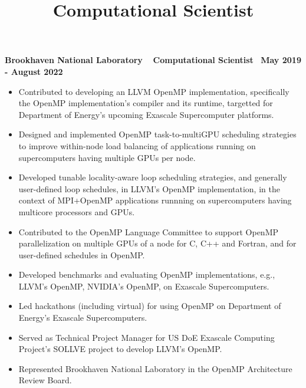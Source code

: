 \title{Computational Scientist} 
\textbf{{Brookhaven National Laboratory $\>$$\>$$\>$$\>$Computational Scientist$\>$$\>$$\>$$\>$May 2019 - August 2022}}
\begin{itemize}
   \item Contributed to developing an LLVM OpenMP implementation, specifically the OpenMP implementation's compiler and its runtime, targetted for Department of Energy's upcoming Exascale Supercomputer platforms. 
   \item Designed and implemented OpenMP task-to-multiGPU scheduling strategies to improve within-node load balancing of applications running on supercomputers having multiple GPUs per node.
   \item Developed tunable locality-aware loop scheduling strategies, and generally user-defined loop schedules, in LLVM's OpenMP implementation, in the context of MPI+OpenMP applications runnning on supercomputers having multicore processors and GPUs. 
   \item Contributed to the OpenMP Language Committee to support OpenMP parallelization on multiple GPUs of a node for C, C++ and Fortran, and for user-defined schedules in OpenMP.
   \item Developed benchmarks and evaluating OpenMP implementations, e.g., LLVM's OpenMP, NVIDIA's OpenMP, on Exascale Supercomputers.
   \item Led hackathons (including virtual) for using OpenMP on Department of Energy's Exascale Supercomputers.
   \item Served as Technical Project Manager for US DoE Exascale Computing Project’s SOLLVE project to develop LLVM's OpenMP.
   \item Represented Brookhaven National Laboratory in the OpenMP Architecture Review Board. 
\end{itemize}

